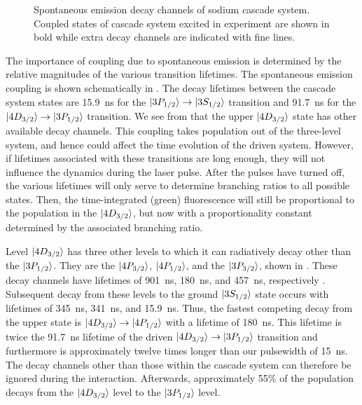 \begin{figure}[tbp]
\bigskip
{}
{Spontaneous emission decay channels of sodium cascade system.
Coupled states of cascade system excited in experiment are shown in bold while
extra decay channels are indicated with fine lines.
\label{Na_decay}}
\end{figure}

The importance of coupling due to spontaneous emission is determined by
the relative magnitudes of the various transition lifetimes.  The spontaneous
emission coupling is shown schematically in .  The decay lifetimes
between the cascade system states are 15.9~ns for the $\vert 3P_{1/2} \rangle
\rightarrow \vert 3S_{1/2} \rangle$ transition and 91.7~ns for the $\vert 4D_{3/2} \rangle
\rightarrow \vert 3P_{1/2} \rangle$ transition.  We see from  that the
upper $\vert 4D_{3/2} \rangle$ state has other available decay channels. 
This coupling takes population out of the three-level system, and
hence could affect the time evolution of the driven system.  However, if
lifetimes associated with these transitions are long enough, they will not
influence the dynamics during the laser pulse.  After the pulses have turned
off, the various lifetimes will only serve to determine branching ratios to
all possible states.  Then, the time-integrated (green) fluorescence will
still be proportional to the population in the $\vert 4D_{3/2} \rangle$, but now
with a proportionality constant determined by the associated branching ratio.

Level $\vert 4D_{3/2} \rangle$ has three other levels to which it can radiatively decay
other than the $\vert 3P_{1/2} \rangle$.  They are the $\vert 4P_{3/2} \rangle$,
$\vert 4P_{1/2} \rangle$, and the $\vert 3P_{3/2} \rangle$, shown in .  These
decay channels have lifetimes of 901~ns, 180~ns, and 457~ns, respectively
\cite{Wiese:69}.  Subsequent decay from these levels to the ground
$\vert 3S_{1/2} \rangle$ state occurs with lifetimes of 345~ns, 341~ns, and 15.9~ns. 
Thus, the fastest competing decay from the upper state is $\vert 4D_{3/2} \rangle
\rightarrow \vert 4P_{1/2} \rangle$ with a lifetime of 180~ns.  This lifetime is twice
the 91.7~ns lifetime of the driven $\vert 4D_{3/2} \rangle \rightarrow \vert 3P_{1/2} \rangle$
transition and furthermore is approximately twelve times longer than our
pulsewidth of 15~ns.  The decay channels other than those within the cascade
system can therefore be ignored during the interaction.  Afterwards,
approximately 55\% of the population decays from the $\vert 4D_{3/2} \rangle$
level to the $\vert 3P_{1/2} \rangle$ level.

